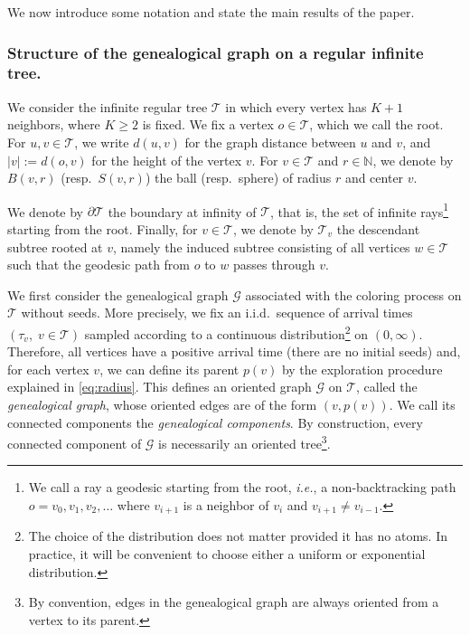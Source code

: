 \documentclass[french]{article}
\newcommand{\N}{\mathbb{N}}
\newcommand{\T}{\mathcal{T}}
\renewcommand{\1}{\mathds{1}}
\begin{document}
We now introduce some notation and state the main results of the paper.

\subsubsection{Structure of the genealogical graph on a regular infinite tree.}

We consider the infinite regular tree $\T$ in which every vertex has $K+1$ neighbors, where $K \ge 2$ is fixed. We fix a vertex $o \in \T$, which we call the root. For $u,v \in \T$, we write $d(u,v)$ for the graph distance between $u$ and $v$, and $|v| := d(o,v)$ for the height of the vertex $v$. For $v\in \T$ and $r\in \N$, we denote by $B(v,r)$ (resp.\ $S(v,r)$) the ball (resp.\ sphere) of radius $r$ and center $v$.

\medskip

We denote by $\partial \T$ the boundary at infinity of $\T$, that is, the set of infinite rays\footnote{We call a ray a geodesic starting from the root, \emph{i.e.}, a non-backtracking path $o = v_0, v_1,v_2, \ldots$ where $v_{i+1}$ is a neighbor of $v_i$ and $v_{i+1} \neq v_{i-1}$.} starting from the root. Finally, for $v \in \T$, we denote by $\T_v$ the descendant subtree rooted at $v$, namely the induced subtree consisting of all vertices $w \in \T$ such that the geodesic path from $o$ to $w$ passes through $v$.

\medskip

We first consider the genealogical graph $\mathcal{G}$ associated with the coloring process on $\T$ without seeds. More precisely, we fix an i.i.d.\ sequence of arrival times $(\tau_v,\; v \in \T)$ sampled according to a continuous distribution\footnote{The choice of the distribution does not matter provided it has no atoms. In practice, it will be convenient to choose either a uniform or exponential distribution.} on $(0,\infty)$. Therefore, all vertices have a positive arrival time (there are no initial seeds) and, for each vertex $v$, we can define its parent $p(v)$ by the exploration procedure explained in \eqref{eq:radius}. This defines an oriented graph $\mathcal{G}$ on $\T$, called the \emph{genealogical graph}, whose oriented edges are of the form $(v,p(v))$. We call its connected components the \emph{genealogical components}. By construction, every connected component of $\mathcal G$ is necessarily an oriented tree\footnote{By convention, edges in the genealogical graph are always oriented from a vertex to its parent.}.
\medskip
\end{document}
